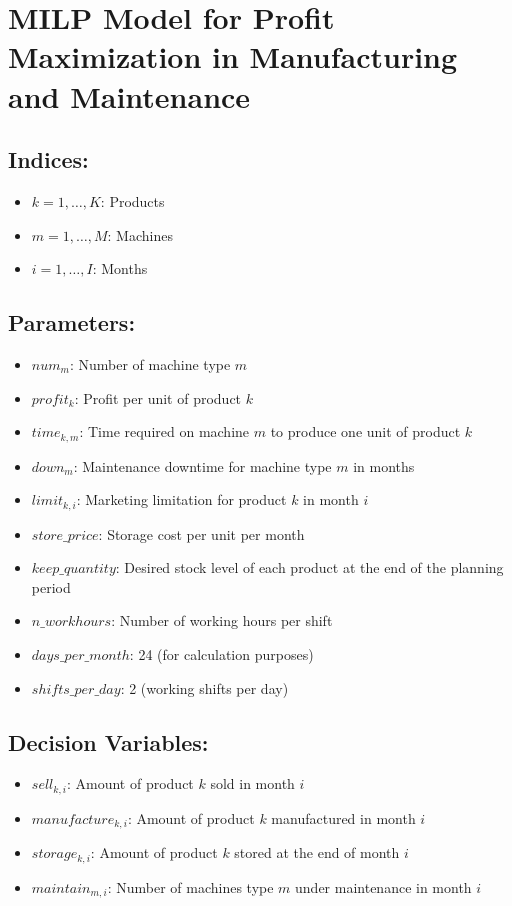 \documentclass{article}
\begin{document}
\section*{MILP Model for Profit Maximization in Manufacturing and Maintenance}

\subsection*{Indices:}
\begin{itemize}
    \item $k = 1, \ldots, K$: Products
    \item $m = 1, \ldots, M$: Machines
    \item $i = 1, \ldots, I$: Months
\end{itemize}

\subsection*{Parameters:}
\begin{itemize}
    \item $num_{m}$: Number of machine type $m$
    \item $profit_k$: Profit per unit of product $k$
    \item $time_{k,m}$: Time required on machine $m$ to produce one unit of product $k$
    \item $down_{m}$: Maintenance downtime for machine type $m$ in months
    \item $limit_{k,i}$: Marketing limitation for product $k$ in month $i$
    \item $store\_price$: Storage cost per unit per month
    \item $keep\_quantity$: Desired stock level of each product at the end of the planning period
    \item $n\_workhours$: Number of working hours per shift
    \item $days\_per\_month$: 24 (for calculation purposes)
    \item $shifts\_per\_day$: 2 (working shifts per day)
\end{itemize}

\subsection*{Decision Variables:}
\begin{itemize}
    \item $sell_{k,i}$: Amount of product $k$ sold in month $i$
    \item $manufacture_{k,i}$: Amount of product $k$ manufactured in month $i$
    \item $storage_{k,i}$: Amount of product $k$ stored at the end of month $i$
    \item $maintain_{m,i}$: Number of machines type $m$ under maintenance in month $i$
\end{itemize}
\end{document}
